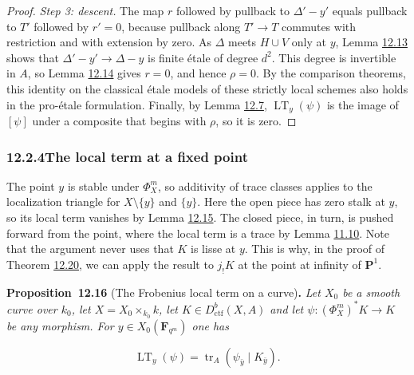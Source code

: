 \documentclass[11pt]{article}
\newenvironment{bpstatement}[2]{\par\addvspace{0.6\baselineskip}\noindent\textbf{#1}#2\textbf{.}\enspace\ignorespaces}
  {\par\addvspace{0.4\baselineskip}}
\newenvironment{bpstatementit}[2]{\begin{bpstatement}{#1}{#2}\itshape\ignorespaces}{\end{bpstatement}}
\begin{document}
\begin{proof}[{Proof}]
\emph{Step 3: descent.} The map \(r\) followed by pullback to \(\Delta'-y'\) equals pullback to \(T'\) followed by \(r'=0\), because pullback along \(T'\to T\) commutes with restriction and with extension by zero. As \(\Delta\) meets \(H\cup V\) only at \(y\), Lemma \hyperref[bp265]{12.13} shows that \(\Delta'-y'\to\Delta-y\) is finite étale of degree \(d^2\). This degree is invertible in \(A\), so Lemma \hyperref[bp267]{12.14} gives \(r=0\), and hence \(\rho=0\). By the comparison theorems, this identity on the classical étale models of these strictly local schemes also holds in the pro-étale formulation. Finally, by Lemma \hyperref[bp246]{12.7}, \(\operatorname{LT}_y(\psi)\) is the image of \([\psi]\) under a composite that begins with \(\rho\), so it is zero.
\end{proof}


\subsubsection*{\texorpdfstring{12.2.4\quad The local term at a fixed point}{12.2.4 The local term at a fixed point}}
\label{bp272}%
\label{bp273}%
The point \(y\) is stable under \(\Phi_X^m\), so additivity of trace classes applies to the localization triangle for \(X\setminus\{y\}\) and \(\{y\}\). Here the open piece has zero stalk at \(y\), so its local term vanishes by Lemma \hyperref[bp270]{12.15}. The closed piece, in turn, is pushed forward from the point, where the local term is a trace by Lemma \hyperref[bp199]{11.10}. Note that the argument never uses that \(K\) is lisse at \(y\). This is why, in the proof of Theorem \hyperref[bp287]{12.20}, we can apply the result to \(j_!K\) at the point at infinity of \(\mathbf P^1\).

\label{bp274}%
\begin{bpstatementit}{Proposition~12.16}{ (The Frobenius local term on a curve)}
Let \(X_0\) be a smooth curve over \(k_0\), let \(X=X_0\times_{k_0}k\), let \(K\in D^b_{\mathrm{ctf}}(X,A)\) and let \(\psi:(\Phi_X^m)^*K\to K\) be any morphism. For \(y\in X_0(\mathbf F_{q^m})\) one has

\[
\operatorname{LT}_y(\psi)
=\operatorname{tr}_A(\psi_{\bar y}\mid K_{\bar y}).
\]
\end{bpstatementit}
\end{document}
